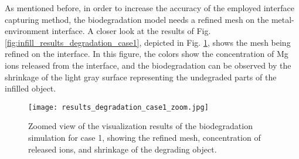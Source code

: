 As mentioned before, in order to increase the accuracy of the employed interface capturing method, the biodegradation model needs a refined mesh on the metal-environment interface. A closer look at the results of Fig. \ref{fig:infill_results_degradation_case1}, depicted in Fig. \ref{fig:infill_results_degradation_case1_zoom}, shows the mesh being refined on the interface. In this figure, the colors show the concentration of Mg ions released from the interface, and the biodegradation can be observed by the shrinkage of the light gray surface representing the undegraded parts of the infilled object.


\begin{figure}[h]
\centering
\medskip
\texttt{[image: results\_degradation\_case1\_zoom.jpg]}
\caption[Zoom view of the results of the biodegradation simulation for case 1]{Zoomed view of the visualization results of the biodegradation simulation for case 1, showing the refined mesh, concentration of released ions, and shrinkage of the degrading object.} \label{fig:infill_results_degradation_case1_zoom}
\end{figure}

\cleardoublepage

